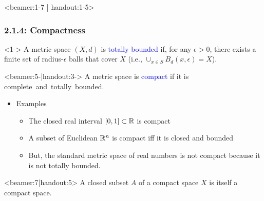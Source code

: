 \documentclass[10pt,english,aspectratio=169]{beamer}
\begin{document}
\begin{frame}<beamer:1-7 | handout:1-5>
\frametitle{2.1.4: Compactness}

\begin{definition}<1->
A metric space $(X,d)$ is \textcolor{blue}{totally bounded} if, for any $\epsilon > 0$, there exists a finite set of radius-$\epsilon$ balls that cover $X$ (i.e., $\cup_{x\in S} B_d (x,\epsilon) = X$).
\end{definition}

\begin{definition}<beamer:5-|handout:3->
A metric space is \textcolor{blue}{compact} if it is complete~and~totally~bounded.
\end{definition}

\begin{itemize}
\setlength\itemsep{3mm}
\item<beamer:6-|handout:4-> Examples \vspace{1mm}
\begin{itemize} 
  \setlength\itemsep{1.5mm}
  \item The closed real interval $[0,1]\subset \mathbb{R}$ is compact
  \item A subset of Euclidean $\mathbb{R}^n$ is compact iff it is closed and bounded
  \item But, the standard metric space of real numbers is not compact because it is not totally bounded.
\end{itemize}

\end{itemize}

\begin{theorem}<beamer:7|handout:5>
A closed subset $A$ of a compact space $X$ is itself a compact space.
\end{theorem}

\end{frame}
\end{document}
